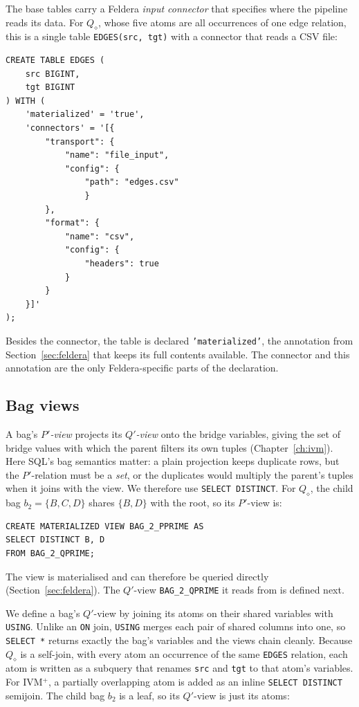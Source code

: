 The base tables carry a Feldera \emph{input connector} that specifies where the pipeline reads its data.
For $Q_\diamond$, whose five atoms are all occurrences of one edge relation, this is a single table \texttt{EDGES(src, tgt)} with a connector that reads a CSV file:

\begin{lstlisting}[caption={The \texttt{EDGES} table with a CSV input connector.}]
CREATE TABLE EDGES (
    src BIGINT,
    tgt BIGINT
) WITH (
    'materialized' = 'true',
    'connectors' = '[{
        "transport": {
            "name": "file_input",
            "config": { 
                "path": "edges.csv" 
                } 
        },
        "format": { 
            "name": "csv", 
            "config": { 
                "headers": true 
            } 
        }
    }]'
);
\end{lstlisting}

Besides the connector, the table is declared \texttt{'materialized'}, the annotation from Section~\ref{sec:feldera} that keeps its full contents available.
The connector and this annotation are the only Feldera-specific parts of the declaration.

\subsection{Bag views}

A bag's \emph{$P'$-view} projects its \emph{$Q'$-view} onto the bridge variables, giving the set of bridge values with which the parent filters its own tuples (Chapter~\ref{ch:ivm}).
Here SQL's bag semantics matter: a plain projection keeps duplicate rows, but the $P'$-relation must be a \emph{set}, or the duplicates would multiply the parent's tuples when it joins with the view.
We therefore use \texttt{SELECT DISTINCT}.
For $Q_\diamond$, the child bag $b_2 = \{B,C,D\}$ shares $\{B,D\}$ with the root, so its $P'$-view is:

\begin{lstlisting}[caption={The $P'$-view of the child bag $b_2$.}]
CREATE MATERIALIZED VIEW BAG_2_PPRIME AS
SELECT DISTINCT B, D
FROM BAG_2_QPRIME;
\end{lstlisting}

The view is materialised and can therefore be queried directly (Section~\ref{sec:feldera}).
The $Q'$-view \texttt{BAG\_2\_QPRIME} it reads from is defined next.

We define a bag's $Q'$-view by joining its atoms on their shared variables with \texttt{USING}.
Unlike an \texttt{ON} join, \texttt{USING} merges each pair of shared columns into one, so \texttt{SELECT *} returns exactly the bag's variables and the views chain cleanly.
Because $Q_\diamond$ is a self-join, with every atom an occurrence of the same \texttt{EDGES} relation, each atom is written as a subquery that renames \texttt{src} and \texttt{tgt} to that atom's variables.
For IVM$^+$, a partially overlapping atom is added as an inline \texttt{SELECT DISTINCT} semijoin.
The child bag $b_2$ is a leaf, so its $Q'$-view is just its atoms:

